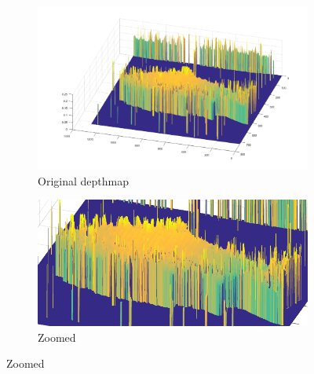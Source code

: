 \begin{figure}[H]
    \begin{subfigure}{0.41\textwidth}
        \includegraphics[width=\linewidth]{images/results/3D_plots/original_3D_87}
        \caption{Original depthmap}
    \end{subfigure}\hspace*{\fill}
    \begin{subfigure}{0.57\textwidth}
        \includegraphics[width=\linewidth]{images/results/3D_plots/original_3D_63}
        \caption{Zoomed}
    \end{subfigure}
    

\end{figure}
